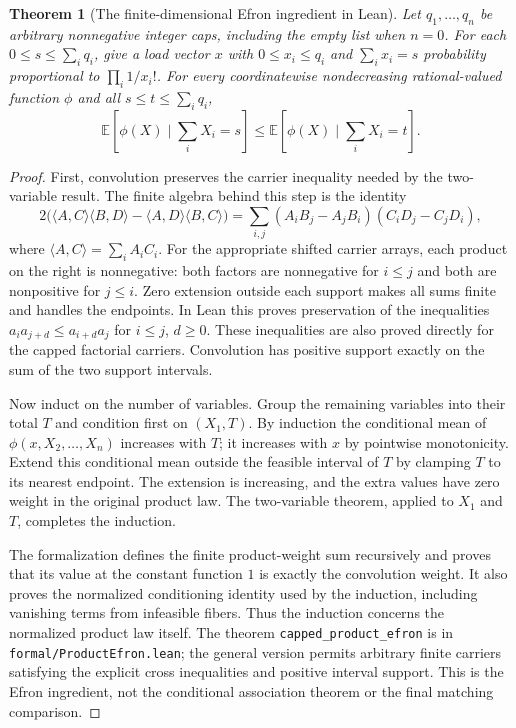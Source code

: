 \documentclass[11pt]{article}
\newtheorem{theorem}{Theorem}
\begin{document}
\begin{theorem}[The finite-dimensional Efron ingredient in Lean]\label{thm:leanefronproduct}
Let $q_1,\ldots,q_n$ be arbitrary nonnegative integer caps, including the
empty list when $n=0$. For each $0\leq s\leq\sum_iq_i$, give a load vector
$x$ with $0\leq x_i\leq q_i$ and $\sum_i x_i=s$ probability proportional
to $\prod_i1/x_i!$. For every coordinatewise nondecreasing rational-valued
function $\phi$ and all $s\leq t\leq\sum_iq_i$,
\[
 \mathbb E[\phi(X)\mid\textstyle\sum_iX_i=s]
 \leq \mathbb E[\phi(X)\mid\textstyle\sum_iX_i=t].
\]
\end{theorem}
\begin{proof}
First, convolution preserves the carrier inequality needed by the
two-variable result. The finite algebra behind this step is the identity
\[
 2\bigl(\langle A,C\rangle\langle B,D\rangle
       -\langle A,D\rangle\langle B,C\rangle\bigr)
 =\sum_{i,j}(A_iB_j-A_jB_i)(C_iD_j-C_jD_i),
\]
where $\langle A,C\rangle=\sum_iA_iC_i$.
For the appropriate shifted carrier arrays, each product on the right
is nonnegative: both factors are nonnegative for $i\leq j$ and both are
nonpositive for $j\leq i$. Zero extension outside each support makes all
sums finite and handles the endpoints. In Lean this proves preservation
of the inequalities
$a_i a_{j+d}\leq a_{i+d}a_j$ for $i\leq j$, $d\geq0$.
These inequalities are also proved directly for the capped factorial
carriers. Convolution has positive support exactly on the sum of the
two support intervals.

Now induct on the number of variables. Group the remaining variables
into their total $T$ and condition first on $(X_1,T)$. By induction the
conditional mean of $\phi(x,X_2,\ldots,X_n)$ increases with $T$;
it increases with $x$ by pointwise monotonicity. Extend this conditional
mean outside the feasible interval of $T$ by clamping $T$ to its nearest
endpoint. The extension is increasing, and the extra values have zero
weight in the original product law. The two-variable theorem, applied to
$X_1$ and $T$, completes the induction.

The formalization defines the finite product-weight sum recursively and
proves that its value at the constant function $1$ is exactly the
convolution weight. It also proves the normalized conditioning identity
used by the induction, including vanishing terms from infeasible fibers.
Thus the induction concerns the normalized product law itself.
The theorem \texttt{capped\_product\_efron} is in
\texttt{formal/ProductEfron.lean}; the general version permits arbitrary
finite carriers satisfying the explicit cross inequalities and positive
interval support. This is the Efron ingredient, not the conditional
association theorem or the final matching comparison.
\end{proof}
\end{document}
